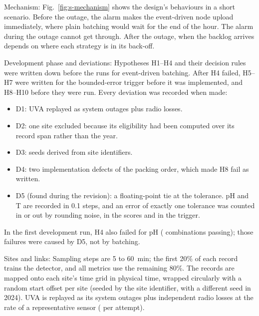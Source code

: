 \documentclass[journal]{IEEEtran}
\begin{document}
Mechanism: Fig.~\ref{fig:s-mechanism} shows the design's behaviours in a short scenario. Before the outage, the alarm makes the event-driven node upload immediately, where plain batching would wait for the end of the hour. The alarm during the outage cannot get through. After the outage, when the backlog arrives depends on where each strategy is in its back-off.

Development phase and deviations: Hypotheses H1--H4 and their decision rules were written down before the runs for event-driven batching. After H4 failed, H5--H7 were written for the bounded-error trigger before it was implemented, and H8--H10 before they were run. Every deviation was recorded when made:
\begin{itemize}
\item D1: UVA replayed as system outages plus radio losses.
\item D2: one site excluded because its eligibility had been computed over its record span rather than the year.
\item D3: seeds derived from site identifiers.
\item D4: two implementation defects of the packing order, which made H8 fail as written.
\item D5 (found during the revision): a floating-point tie at the tolerance. pH and T are recorded in 0.1 steps, and an error of exactly one tolerance was counted in or out by rounding noise, in the scores and in the trigger.
\end{itemize}
In the first development run, H4 also failed for pH (\hFourPassVOne{} combinations passing); those failures were caused by D5, not by batching.

Sites and links: Sampling steps are 5 to 60~min; the first 20\% of each record trains the detector, and all metrics use the remaining 80\%. The records are mapped onto each site's time grid in physical time, wrapped circularly with a random start offset per site (seeded by the site identifier, with a different seed in 2024). UVA is replayed as its system outages plus independent radio losses at the rate of a representative sensor (\uvaSensorFourRadio{} per attempt).
\end{document}
